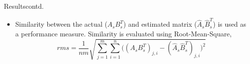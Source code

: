 \documentclass{beamer}
\begin{document}
\begin{frame}{Results}{contd.}
	\begin{itemize}
		\vspace{-0 in}		
		\item{Similarity between the actual ($A_sB_s^T$) and estimated matrix ($\hat{A}_s\hat{B}_s^T$) is used as a performance measure. Similarity is evaluated using Root-Mean-Square}, \newline\vspace{0 in}
		\begin{equation}
			rms = \frac{1}{nm}\sqrt{\sum_{j=1}^{m}\sum_{i=1}^{n} \Big((A_sB_s^T)_{j, i} - (\hat{A}_s\hat{B}_s^T)_{j, i}\Big)^2}
		\end{equation} \newline
		\vspace{-0.in}
		\end{itemize}
\end{frame}
\end{document}
